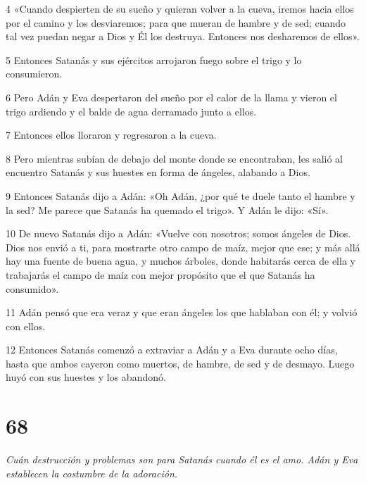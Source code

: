 \par 4 «Cuando despierten de su sueño y quieran volver a la cueva, iremos hacia ellos por el camino y los desviaremos; para que mueran de hambre y de sed; cuando tal vez puedan negar a Dios y Él los destruya. Entonces nos desharemos de ellos».

\par 5 Entonces Satanás y sus ejércitos arrojaron fuego sobre el trigo y lo consumieron.

\par 6 Pero Adán y Eva despertaron del sueño por el calor de la llama y vieron el trigo ardiendo y el balde de agua derramado junto a ellos.

\par 7 Entonces ellos lloraron y regresaron a la cueva.

\par 8 Pero mientras subían de debajo del monte donde se encontraban, les salió al encuentro Satanás y sus huestes en forma de ángeles, alabando a Dios.

\par 9 Entonces Satanás dijo a Adán: «Oh Adán, ¿por qué te duele tanto el hambre y la sed? Me parece que Satanás ha quemado el trigo». Y Adán le dijo: «Sí».

\par 10 De nuevo Satanás dijo a Adán: «Vuelve con nosotros; somos ángeles de Dios. Dios nos envió a ti, para mostrarte otro campo de maíz, mejor que ese; y más allá hay una fuente de buena agua, y muchos árboles, donde habitarás cerca de ella y trabajarás el campo de maíz con mejor propósito que el que Satanás ha consumido».

\par 11 Adán pensó que era veraz y que eran ángeles los que hablaban con él; y volvió con ellos.

\par 12 Entonces Satanás comenzó a extraviar a Adán y a Eva durante ocho días, hasta que ambos cayeron como muertos, de hambre, de sed y de desmayo. Luego huyó con sus huestes y los abandonó.

\chapter{68}

\par \textit{Cuán destrucción y problemas son para Satanás cuando él es el amo. Adán y Eva establecen la costumbre de la adoración.}

